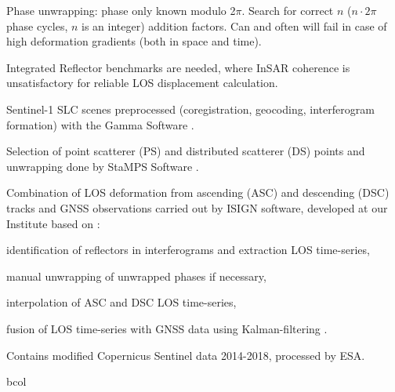 \documentclass[a0, 18pt, landscape]{a0poster}
\newcommand{\finc}[1] {
    \begin{mdframed}[linecolor=fcol, linewidth=5.0pt, roundcorner=5pt,
                     innerrightmargin=0pt, innerleftmargin=0pt,
                     innertopmargin=0pt, innerbottommargin=0pt,
                     skipabove=0pt, skipbelow=0pt,
                     backgroundcolor=white, frametitle={}, align=center]
    \begin{center}
        \inc{#1}
    \end{center}
    \end{mdframed}
}
\begin{document}
\begin{multicols}{3}
    Phase unwrapping: phase only known modulo 2$\pi$. Search for correct $n$ ($n \cdot 2\pi$ phase cycles,
    $n$ is an integer) addition factors. Can and often will fail in case of high deformation
    gradients (both in space and time).
\eblock


    \bitz
        \item Integrated Reflector benchmarks are needed, where InSAR coherence is unsatisfactory
              for reliable LOS displacement calculation.
        \item Sentinel-1 SLC scenes preprocessed (coregistration, geocoding, interferogram formation)
              with the Gamma Software \cite{werner2000gamma}.
        \item Selection of point scatterer (PS) and distributed scatterer (DS) points and unwrapping done by StaMPS Software \cite{Hooper2008}.
        \item Combination of LOS deformation from ascending (ASC) and descending (DSC) tracks and GNSS observations carried
              out by ISIGN software, developed at our Institute based on \cite{Banyai2016}:
        \bitz
            \item identification of reflectors in interferograms and extraction LOS time-series,
            \item manual unwrapping of unwrapped phases if necessary,
            \item interpolation of ASC and DSC LOS time-series,
            \item fusion of LOS time-series with GNSS data using Kalman-filtering \cite{kalmanfilt}.
        \eitz
    \eitz
    \vspace{25pt}
    
        \finc{hungary_networks.png}
    \emini
    \emini

\eblock
\vspace{15pt}

\begin{ack}
    \small
    Contains modified Copernicus Sentinel data 2014-2018, processed by ESA.
\end{ack}
\vspace{15pt}

\begin{bib}{bcol}
    \tiny
    
\end{bib}



\end{multicols}
\end{document}

